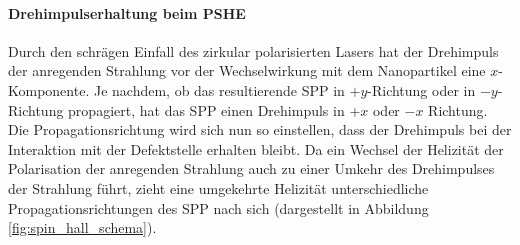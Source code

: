\documentclass[titlepage,  ngerman]{article}
\begin{document}
	\paragraph{Drehimpulserhaltung beim PSHE}
	Durch den schrägen Einfall des zirkular polarisierten Lasers hat der Drehimpuls der anregenden Strahlung vor der Wechselwirkung mit dem Nanopartikel eine $x$-Komponente. Je nachdem, ob das resultierende SPP in $+y$-Richtung oder in $-y$-Richtung propagiert, hat das SPP einen Drehimpuls in  $+x$ oder $-x$ Richtung. Die Propagationsrichtung wird sich nun so einstellen, dass der Drehimpuls bei der Interaktion mit der Defektstelle erhalten bleibt. Da ein Wechsel der Helizität der Polarisation der anregenden Strahlung auch zu einer Umkehr des Drehimpulses der Strahlung führt, zieht eine umgekehrte Helizität unterschiedliche Propagationsrichtungen des SPP nach sich (dargestellt in Abbildung \ref{fig:spin_hall_schema}).
\end{document}
